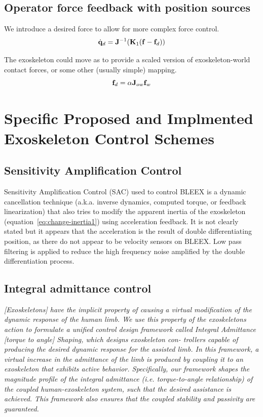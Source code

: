 \documentclass[letterpaper,12pt,fullpage]{article}
\begin{document}
\subsection{Operator force feedback with position sources}

We introduce a desired force to allow for more complex force control.
\begin{equation}
\dot{{\bf q}}_d = {\bf J}^{-1} ({\bf K}_1 ({\bf f} - {\bf f}_d))
\end{equation}

The exoskeleton could move as to provide a scaled version of exoskeleton-world
contact forces, or some other (usually simple) mapping. 
\begin{equation}
{\bf f}_d = \alpha {\bf J}_{ow} {\bf f}_w
\end{equation}

\section{Specific Proposed and Implmented Exoskeleton Control Schemes}

\subsection{Sensitivity Amplification Control}

Sensitivity Amplification Control (SAC) used to control BLEEX
is a dynamic cancellation technique (a.k.a.
inverse dynamics, computed torque, or feedback linearization) that also tries
to modify the apparent inertia of the exoskeleton (equation~\ref{eq:change-inertia1})
using acceleration feedback. It is not clearly stated but it appears that the
acceleration is the result of double differentiating position, as there do not
appear to be velocity sensors on BLEEX. Low pass filtering is applied to reduce
the high frequency noise amplified by the double differentiation process.

\subsection{Integral admittance control}

{\it [Exoskeletons] have the implicit property
of causing a virtual modification of the dynamic response of
the human limb. We use this property of the exoskeletons
action to formulate a unified control design framework called
Integral Admittance [torque to angle] Shaping, which designs exoskeleton con-
trollers capable of producing the desired dynamic response
for the assisted limb. In this framework, a virtual increase
in the admittance of the limb is produced by coupling it
to an exoskeleton that exhibits active behavior. Specifically,
our framework shapes the magnitude profile of the integral
admittance (i.e. torque-to-angle relationship) of the coupled
human-exoskeleton system, such that the desired assistance is
achieved. This framework also ensures that the coupled stability
and passivity are guaranteed.}~\cite{Nagarajan_etal_2015}
\end{document}
